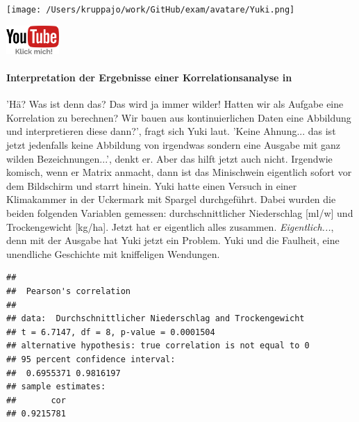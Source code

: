 \documentclass[a4paper, 9pt]{scrartcl}\usepackage[]{graphicx}\usepackage[]{xcolor}
\makeatletter
\newenvironment{kframe}{%
 \def\at@end@of@kframe{}%
 \ifinner\ifhmode%
  \def\at@end@of@kframe{\end{minipage}}%
  \begin{minipage}{\columnwidth}%
 \fi\fi%
 \def\FrameCommand##1{\hskip\@totalleftmargin \hskip-\fboxsep
 \colorbox{shadecolor}{##1}\hskip-\fboxsep
     \hskip-\linewidth \hskip-\@totalleftmargin \hskip\columnwidth}%
 \MakeFramed {\advance\hsize-\width
   \@totalleftmargin\z@ \linewidth\hsize
   \@setminipage}}%
 {\par\unskip\endMakeFramed%
 \at@end@of@kframe}
\newenvironment{knitrout}{}{} %
\makeatother
\begin{document}
 
\begin{minipage}[t]{0.5\textwidth}
\texttt{[image: /Users/kruppajo/work/GitHub/exam/avatare/Yuki.png]}
\end{minipage}
\begin{minipage}[t]{0.5\textwidth}
\hfill
\href{https://youtu.be/C9skfFRTHhI}{\includegraphics[width = 2cm]{img/youtube}}
\end{minipage}
\vspace{-3ex}



\paragraph{Interpretation der Ergebnisse einer Korrelationsanalyse in \Rlogo}

'Hä? Was ist denn das? Das wird ja immer wilder! Hatten wir als Aufgabe eine Korrelation zu berechnen? Wir bauen aus kontinuierlichen Daten eine Abbildung und interpretieren diese dann?', fragt sich Yuki laut. 'Keine Ahnung... das ist jetzt jedenfalls keine Abbildung von irgendwas sondern eine \Rlogo Ausgabe mit ganz wilden Bezeichnungen...', denkt er. Aber das hilft jetzt auch nicht. Irgendwie komisch, wenn er Matrix anmacht, dann ist das Minischwein eigentlich sofort vor dem Bildschirm und starrt hinein. Yuki hatte einen Versuch in einer Klimakammer in der Uckermark mit Spargel durchgeführt. Dabei wurden die beiden folgenden Variablen gemessen: durchschnittlicher Niederschlag [ml/w] und Trockengewicht [kg/ha]. Jetzt hat er eigentlich alles zusammen. \textit{Eigentlich...}, denn mit der \Rlogo Ausgabe hat Yuki jetzt ein Problem. Yuki und die Faulheit, eine unendliche Geschichte mit kniffeligen Wendungen. 


\begin{knitrout}
\color{fgcolor}\begin{kframe}
\begin{verbatim}
## 
## 	Pearson's correlation
## 
## data:  Durchschnittlicher Niederschlag and Trockengewicht
## t = 6.7147, df = 8, p-value = 0.0001504
## alternative hypothesis: true correlation is not equal to 0
## 95 percent confidence interval:
##  0.6955371 0.9816197
## sample estimates:
##       cor 
## 0.9215781
\end{verbatim}
\end{kframe}
\end{knitrout}
\end{document}
